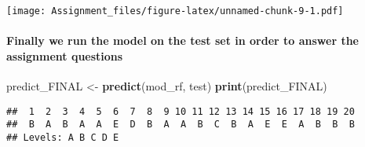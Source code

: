 \documentclass[]{article}
\newenvironment{Shaded}{\begin{snugshade}}{\end{snugshade}}
\newcommand{\KeywordTok}[1]{\textcolor[rgb]{0.13,0.29,0.53}{\textbf{#1}}}
\newcommand{\DataTypeTok}[1]{\textcolor[rgb]{0.13,0.29,0.53}{#1}}
\newcommand{\DecValTok}[1]{\textcolor[rgb]{0.00,0.00,0.81}{#1}}
\newcommand{\StringTok}[1]{\textcolor[rgb]{0.31,0.60,0.02}{#1}}
\newcommand{\OtherTok}[1]{\textcolor[rgb]{0.56,0.35,0.01}{#1}}
\newcommand{\OperatorTok}[1]{\textcolor[rgb]{0.81,0.36,0.00}{\textbf{#1}}}
\newcommand{\NormalTok}[1]{#1}
\let\oldparagraph\paragraph
\renewcommand{\paragraph}[1]{\oldparagraph{#1}\mbox{}}
\begin{document}
\begin{Shaded}
\end{Shaded}

\texttt{[image: Assignment\_files/figure-latex/unnamed-chunk-9-1.pdf]}

\paragraph{Finally we run the model on the test set in order to answer
the assignment
questions}\label{finally-we-run-the-model-on-the-test-set-in-order-to-answer-the-assignment-questions}

\begin{Shaded}
\begin{Highlighting}[]
\NormalTok{predict_FINAL <-}\StringTok{ }\KeywordTok{predict}\NormalTok{(mod_rf, test)}
\KeywordTok{print}\NormalTok{(predict_FINAL)}
\end{Highlighting}
\end{Shaded}

\begin{verbatim}
##  1  2  3  4  5  6  7  8  9 10 11 12 13 14 15 16 17 18 19 20 
##  B  A  B  A  A  E  D  B  A  A  B  C  B  A  E  E  A  B  B  B 
## Levels: A B C D E
\end{verbatim}
\end{document}
